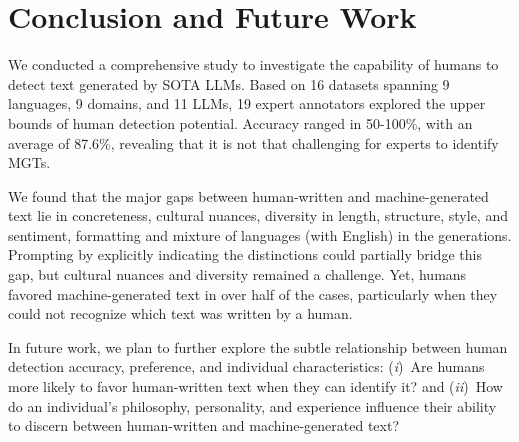 \section{Conclusion and Future Work}
We conducted a comprehensive study to investigate the capability of humans to detect text generated by SOTA LLMs. 
Based on 16 datasets spanning 9 languages, 9 domains, and 11 LLMs, 19 expert annotators explored the upper bounds of human detection potential. Accuracy ranged in 50-100\%, with an average of 87.6\%, revealing that it is not that challenging for experts to identify MGTs.

We found that the major gaps between human-written and machine-generated text lie in concreteness, cultural nuances, diversity in length, structure, style, and sentiment, formatting and mixture of languages (with English) in the generations. 
Prompting by explicitly indicating the distinctions could partially bridge this gap, but cultural nuances and diversity remained a challenge.
Yet, humans favored machine-generated text in over half of the cases, particularly when they could not recognize which text was written by a human.

In future work, we plan to further explore the subtle relationship between human detection accuracy, preference, and individual characteristics: (\emph{i})~Are humans more likely to favor human-written text when they can identify it? and (\emph{ii})~How do an individual's philosophy, personality, and experience influence their ability to discern between human-written and machine-generated text?






